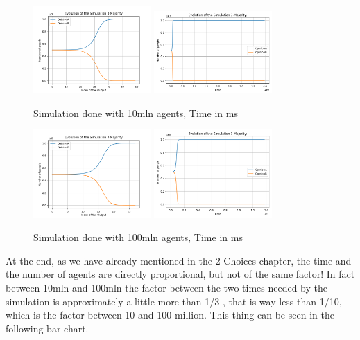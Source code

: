 \begin{figure}[!ht]
     \includegraphics[width=0.40\textwidth,height=0.17\textheight]{img/svg/3_Majority/10mln/withoutTime.png}
     \centering
     \includegraphics[width=0.40\textwidth,height=0.17\textheight]{img/svg/3_Majority/10mln/withTime.png}
     \caption{Simulation done with 10mln agents, Time in ms}
\end{figure}
\begin{figure}[!ht]
     \includegraphics[width=0.40\textwidth,height=0.16\textheight]{img/svg/3_Majority/100mln/withoutTime.png}
     \centering
     \includegraphics[width=0.40\textwidth,height=0.16\textheight]{img/svg/3_Majority/100mln/withTime.png}
     \caption{Simulation done with 100mln agents, Time in ms}
\end{figure}

At the end, as we have already mentioned in the 2-Choices chapter, the time and the number of agents are directly proportional, but not of the same factor! In fact between 10mln and 100mln the factor between the two times needed by the simulation is approximately a little more than 1/3 , that is way less than 1/10, which is the factor between 10 and 100 million. This thing can be seen in the following bar chart.


